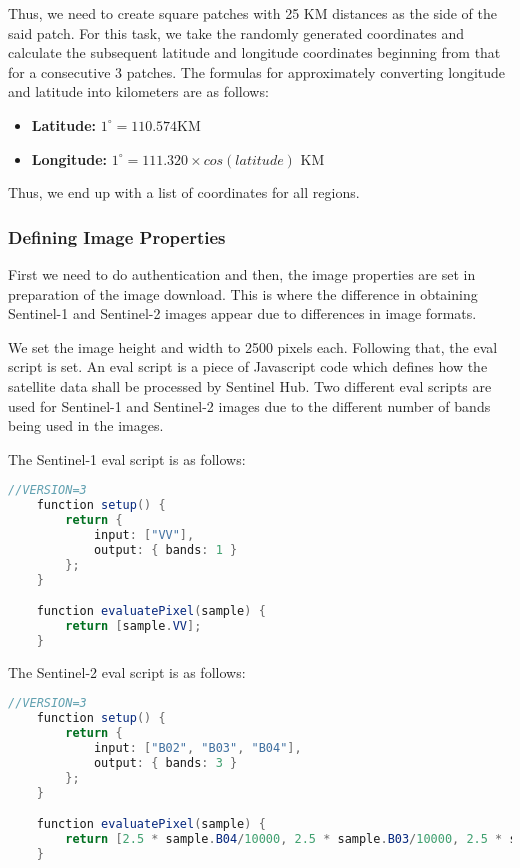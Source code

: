 Thus, we need to create square patches with 25 KM distances as the side of the said patch. For this task, we take the randomly generated coordinates and calculate the subsequent latitude and longitude coordinates beginning from that for a consecutive 3 patches. The formulas for approximately converting longitude and latitude into kilometers are as follows:

\begin{itemize}
    \item \textbf{Latitude: } $1^\circ = 110.574$KM
    \item \textbf{Longitude:} $1^\circ = 111.320\times cos(latitude)$ KM
\end{itemize}

Thus, we end up with a list of coordinates for all regions.

\subsubsection{Defining Image Properties}

First we need to do authentication and then, the image properties are set in preparation of the image download. This is where the difference in obtaining Sentinel-1 and Sentinel-2 images appear due to differences in image formats.

We set the image height and width to 2500 pixels each. Following that, the eval script is set. An eval script is a piece of Javascript code which defines how the satellite data shall be processed by Sentinel Hub\cite{evalDoc}. Two different eval scripts are used for Sentinel-1 and Sentinel-2 images due to the different number of bands being used in the images.

The Sentinel-1 eval script is as follows:

\begin{lstlisting}[language=Java]
    //VERSION=3
    function setup() {
        return {
            input: ["VV"],
            output: { bands: 1 }
        };
    }

    function evaluatePixel(sample) {
        return [sample.VV];
    }
\end{lstlisting}

The Sentinel-2 eval script is as follows:

\begin{lstlisting}[language=Java]
    //VERSION=3
    function setup() {
        return {
            input: ["B02", "B03", "B04"],
            output: { bands: 3 }
        };
    }

    function evaluatePixel(sample) {
        return [2.5 * sample.B04/10000, 2.5 * sample.B03/10000, 2.5 * sample.B02/10000];
    }
\end{lstlisting}

